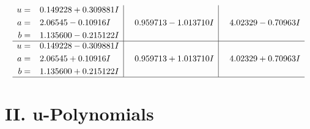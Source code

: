 \documentclass[1p]{elsarticle_modified}
\theoremstyle{definition}
\begin{document}
$$\begin{array}{c|c|c}
\begin{aligned}
u &= \phantom{-}0.149228 + 0.309881 I \\
a &= \phantom{-}2.06545 - 0.10916 I \\
b &= \phantom{-}1.135600 - 0.215122 I\end{aligned}
 & \phantom{-}0.959713 - 1.013710 I & \phantom{-}4.02329 - 0.70963 I \\ \hline\begin{aligned}
u &= \phantom{-}0.149228 - 0.309881 I \\
a &= \phantom{-}2.06545 + 0.10916 I \\
b &= \phantom{-}1.135600 + 0.215122 I\end{aligned}
 & \phantom{-}0.959713 + 1.013710 I & \phantom{-}4.02329 + 0.70963 I\\
 \hline 
 \end{array}$$\newpage
\newpage\renewcommand{\arraystretch}{1}
\centering \section*{ II. u-Polynomials}
\end{document}
